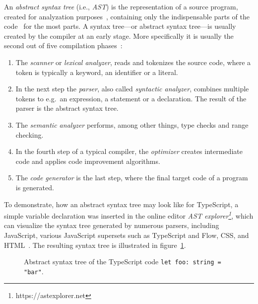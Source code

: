 An \emph{abstract syntax tree} (i.e., \emph{AST}) is the representation of a source program, created for analyzation purposes~\cite[p.~19]{CompilersAndInterpreters:Kenneth:2004}, containing only the indispensable parts of the code~\cite[p.~12]{FormaleSprachenAbstrakteAutomatenUndCompiler:Wagenknecht:2014} for the most parts. A syntax tree---or abstract syntax tree---is usually created by the compiler at an early stage. More specifically it is usually the second out of five compilation phases~\cite[pp.~2--3]{CompilersAndInterpreters:Kenneth:2004}: 
\begin{enumerate}
  \item The \emph{scanner} or \emph{lexical analyzer}, reads and tokenizes the source code, where a token is typically a keyword, an identifier or a literal.
  \item In the next step the \emph{parser}, also called \emph{syntactic analyzer}, combines multiple tokens to e.g.\ an expression, a statement or a declaration. The result of the parser is the abstract syntax tree.
  \item The \emph{semantic analyzer} performs, among other things, type checks and range checking.
  \item In the fourth step of a typical compiler, the \emph{optimizer} creates intermediate code and applies code improvement algorithms.
  \item The \emph{code generator} is the last step, where the final target code of a program is generated.
\end{enumerate}
To demonstrate, how an abstract syntax tree may look like for TypeScript, a simple variable declaration was inserted in the online editor \emph{AST explorer\footnote{https://astexplorer.net}}, which can visualize the syntax tree generated by numerous parsers, including JavaScript, various JavaScript supersets such as TypeScript and Flow, CSS, and HTML~\cite{ASTExplorer}. The resulting syntax tree is illustrated in figure~\ref{fig:ast}.

\begin{figure}
\centering

\caption{Abstract syntax tree of the TypeScript code \texttt{let foo: string = "bar"}.}
\label{fig:ast}
\end{figure}


